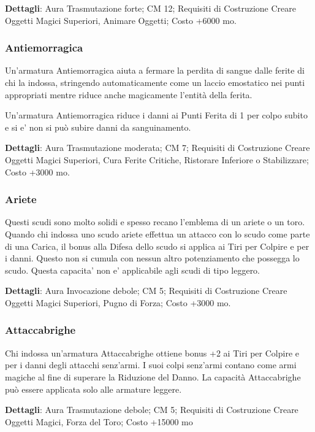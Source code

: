 \begin{multicols}{2}
\textbf{Dettagli}: Aura Trasmutazione forte; CM 12; Requisiti di Costruzione Creare Oggetti Magici Superiori, Animare Oggetti; Costo +6000 mo.

\subsubsection{Antiemorragica}

Un'armatura Antiemorragica aiuta a fermare la perdita di sangue dalle ferite di chi la indossa, stringendo automaticamente come un laccio emostatico nei punti appropriati mentre riduce anche magicamente l'entità della ferita.

Un'armatura Antiemorragica riduce i danni ai Punti Ferita di 1 per colpo subito e si e' non si può subire danni da sanguinamento. 

\textbf{Dettagli}: Aura Trasmutazione moderata; CM 7; Requisiti di Costruzione Creare Oggetti Magici Superiori, Cura Ferite Critiche, Ristorare Inferiore o Stabilizzare; Costo +3000 mo.

\subsubsection{Ariete}

Questi scudi sono molto solidi e spesso recano l'emblema di un ariete o un toro. Quando chi indossa uno scudo ariete effettua un attacco con lo scudo come parte di una Carica, il bonus alla Difesa dello scudo si applica ai Tiri per Colpire e per i danni. Questo non si cumula con nessun altro potenziamento che possegga lo scudo. Questa capacita' non e' applicabile agli scudi di tipo leggero.

\textbf{Dettagli}: Aura Invocazione debole; CM 5; Requisiti di Costruzione Creare Oggetti Magici Superiori, Pugno di Forza; Costo +3000 mo.


\subsubsection{Attaccabrighe}

Chi indossa un'armatura Attaccabrighe ottiene bonus +2 ai Tiri per Colpire e per i danni degli attacchi senz'armi. I suoi colpi senz'armi contano come armi magiche al fine di superare la Riduzione del Danno. La capacità Attaccabrighe può essere applicata solo alle armature leggere.

\textbf{Dettagli}: Aura Trasmutazione debole; CM 5; Requisiti di Costruzione Creare Oggetti Magici, Forza del Toro; Costo +15000 mo


\end{multicols}
